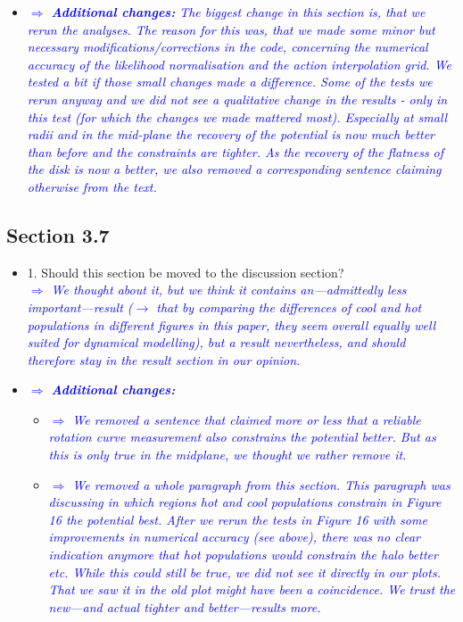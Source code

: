 \documentclass[10pt,a4paper]{article}
\newcommand{\Comment}[1]{\textsl{\textcolor{Blue}{$\Longrightarrow$ {#1}}}}
\begin{document}
\begin{itemize}
\item \Comment{\textbf{Additional changes:} The biggest change in this section is, that we rerun the analyses. The reason for this was, that we made some minor but necessary modifications/corrections in the code, concerning the numerical accuracy of the likelihood normalisation and the action interpolation grid. We tested a bit if those small changes made a difference. Some of the tests we rerun anyway and we did not see a qualitative change in the results - only in this test (for which the changes we made mattered most). Especially at small radii and in the mid-plane the recovery of the potential is now much better than before and the constraints are tighter. As the recovery of the flatness of the disk is now a better, we also removed a corresponding sentence claiming otherwise from the text.}
\end{itemize}

\subsection{Section 3.7}
\begin{itemize}
\item 1. Should this section be moved to the discussion section?
\\\Comment{We thought about it, but we think it contains an---admittedly less important---result ($\longrightarrow$ that by comparing the differences of cool and hot populations in different figures in this paper, they seem overall equally well suited for dynamical modelling), but a result nevertheless, and should therefore stay in the result section in our opinion.}
\item \Comment{\textbf{Additional changes:}} 
\begin{itemize}
\item \Comment{We removed a sentence that claimed more or less that a reliable rotation curve measurement also constrains the potential better. But as this is only true in the midplane, we thought we rather remove it.}
\item \Comment{We removed a whole paragraph from this section. This paragraph was discussing in which regions hot and cool populations constrain in Figure 16 the potential best. After we rerun the tests in Figure 16 with some improvements in numerical accuracy (see above), there was no clear indication anymore that hot populations would constrain the halo better etc. While this could still be true, we did not see it directly in our plots. That we saw it in the old plot might have been a coincidence. We trust the new---and actual tighter and better---results more.}
\end{itemize}
\end{itemize}
\end{document}
